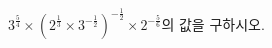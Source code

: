 $3^{\frac{5}{4}}\times(2^{\frac{1}{3}}\times3^{-\frac{1}{2}})^{-\frac{1}{2}}\times2^{-\frac{5}{6}}$의 값을 구하시오.
